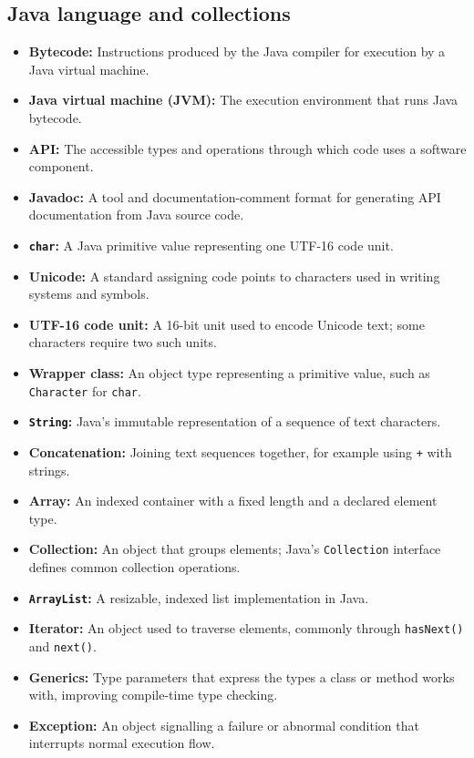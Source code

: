 \documentclass[11pt]{article}
\newenvironment{DottedList}{%
  \begin{itemize}[leftmargin=2em, itemsep=0.35em, topsep=0.35em, label=\textbullet]
}{%
  \end{itemize}
}
\begin{document}
\subsection*{Java language and collections}
\begin{DottedList}
  \item \textbf{Bytecode:} Instructions produced by the Java compiler for execution by a Java virtual machine.
  \item \textbf{Java virtual machine (JVM):} The execution environment that runs Java bytecode.
  \item \textbf{API:} The accessible types and operations through which code uses a software component.
  \item \textbf{Javadoc:} A tool and documentation-comment format for generating API documentation from Java source code.
  \item \textbf{\texttt{char}:} A Java primitive value representing one UTF-16 code unit.
  \item \textbf{Unicode:} A standard assigning code points to characters used in writing systems and symbols.
  \item \textbf{UTF-16 code unit:} A 16-bit unit used to encode Unicode text; some characters require two such units.
  \item \textbf{Wrapper class:} An object type representing a primitive value, such as \texttt{Character} for \texttt{char}.
  \item \textbf{\texttt{String}:} Java's immutable representation of a sequence of text characters.
  \item \textbf{Concatenation:} Joining text sequences together, for example using \texttt{+} with strings.
  \item \textbf{Array:} An indexed container with a fixed length and a declared element type.
  \item \textbf{Collection:} An object that groups elements; Java's \texttt{Collection} interface defines common collection operations.
  \item \textbf{\texttt{ArrayList}:} A resizable, indexed list implementation in Java.
  \item \textbf{Iterator:} An object used to traverse elements, commonly through \texttt{hasNext()} and \texttt{next()}.
  \item \textbf{Generics:} Type parameters that express the types a class or method works with, improving compile-time type checking.
  \item \textbf{Exception:} An object signalling a failure or abnormal condition that interrupts normal execution flow.

\end{DottedList}
\end{document}
